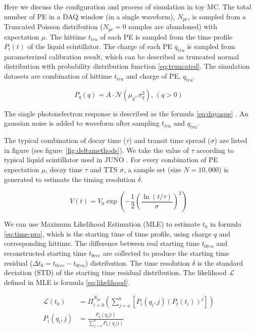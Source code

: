 Here we discuss the configuration and process of simulation in toy MC. The total number of PE in a DAQ window (in a single waveform), $N_{pe}$, is sampled from a Truncated Poisson distribution ($N_{pe}=0$ samples are abandoned) with expectation $\mu$. The hittime $t_{tru}$ of each PE is sampled from the time profile $P_{t}(t)$ of the liquid scintillator. The charge of each PE $q_{tru}$ is sampled from parameterized calibration result, which can be described as truncated normal distribution with probability distribution function \eqref{eq:truncated}. The simulation datasets are combination of hittime $t_{tru}$ and charge of PE, $q_{tru}$. 

\begin{equation}
    P_{q}(q) = A\cdot\mathcal{N}(\mu_{q},\sigma_{q}^{2}),\,(q>0)
    \label{eq:truncated}
\end{equation}

The single photonelectron response is described as the formula \eqref{eq:dayaspe} \cite{jetter_pmt_2012}. An gaussian noise is added to waveform after sampling $t_{tru}$ and $q_{tru}$. 

The typical combination of decay time ($\tau$) and transit time spread ($\sigma$) are listed in figure (see figure~\ref{fig:deltamethods}). We take the value of $\tau$ according to typical liquid scintillator used in JUNO \cite{ludhova_particle_2020}. For every combination of PE expectation $\mu$, decay time $\tau$ and TTS $\sigma$, a sample set (size $N=10,000$) is generated to estimate the timing resolution $\delta$. 

\begin{equation}
    V(t) = V_{0}\exp\left(-\frac{1}{2}\left(\frac{\ln(t/\tau)}{\sigma}\right)^{2}\right)
    \label{eq:dayaspe}
\end{equation}

We can use Maximum Likelihood Estimation (MLE) to estimate $t_{0}$ in formula \eqref{eq:time-pro}, which is the starting time of time profile, using charge $q$ and corresponding hittime. The difference between real starting time $t_{0tru}$ and reconstructed starting time $t_{0rec}$ are collected to produce the starting time residual ($\Delta t_{0}=t_{0rec}-t_{0tru}$) distribution. The time resolution $\delta$ is the standard deviation (STD) of the starting time residual distribution. The likelihood $\mathcal{L}$ defined in MLE is formula \eqref{eq:likelihood}. 

\begin{align}
    \mathcal{L}(t_{0}) &= \Pi_{i=0}^{N_{pe}}\left(\sum_{j=a}^{b}[P_{i}(q_{i},j)(P_{t}(t_{i}))^{j}]\right)
    \label{eq:likelihood} \\
    P_{i}(q_{i},j) &= \frac{P_{q}(q_{i}|j)}{\sum_{j=a}^{b}P_{q}(q_{i}|j)}
\end{align}

